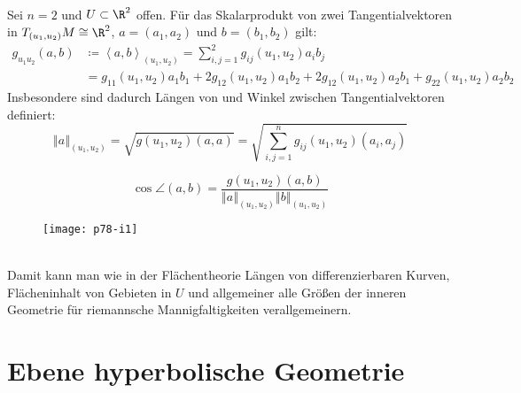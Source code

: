 \begin{remark}
  \ \\
  Sei \( n = 2 \) und \( U \subset \R^2 \) offen. Für das Skalarprodukt von zwei Tangentialvektoren in \( T_{(u_1,u_2)}M \cong \R^2 \), \( a = (a_1, a_2) \) und \( b = (b_1,b_2) \) gilt:
  \begin{align*}
    g_{u_1 u_2}(a,b) &\coloneqq \left\langle a,b \right\rangle_{(u_1, u_2)} = \sum_{i,j = 1}^2 g_{ij}(u_1,u_2)a_i b_j \\
     &= g_{11}(u_1, u_2)a_1 b_1 + 2g_{12}(u_1, u_2)a_1 b_2 + 2g_{12}(u_1, u_2)a_2b_1 + g_{22}(u_1,u_2)a_2 b_2
  \end{align*}
  Insbesondere sind dadurch Längen von und Winkel zwischen Tangentialvektoren definiert:
  \begin{equation*}
    \left\Vert a \right\Vert_{(u_1, u_2)} = \sqrt{g(u_1,u_2)(a,a)} = \sqrt{\sum_{i,j = 1}^n g_{ij}(u_1,u_2)(a_i,a_j)}
  \end{equation*}

  \begin{minipage}{.65\textwidth}
    \begin{equation*}
      \cos \angle (a,b) = \frac{g(u_1,u_2)(a,b)}{\left\Vert a \right\Vert_{(u_1,u_2)} \left\Vert b \right\Vert_{(u_1,u_2)}}
    \end{equation*}
  \end{minipage}
  \hfill
  \begin{minipage}{.325\textwidth}
    \begin{figure}[H]
      \texttt{[image: p78-i1]}
    \end{figure}
  \end{minipage}
  \ \\

  Damit kann man wie in der Flächentheorie Längen von differenzierbaren Kurven, Flächeninhalt von Gebieten in \( U \) und allgemeiner alle Größen der inneren Geometrie für riemannsche Mannigfaltigkeiten verallgemeinern.
\end{remark}

\section{Ebene hyperbolische Geometrie}

